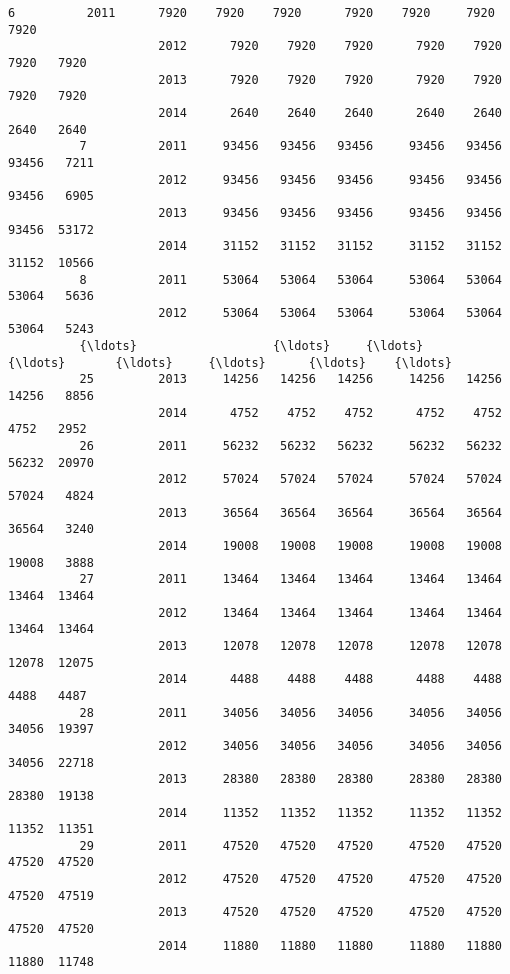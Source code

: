 \documentclass[11pt]{article}
\begin{document}
\begin{Verbatim}[commandchars=\\\{\}]
          6          2011      7920    7920    7920      7920    7920     7920   7920   
                     2012      7920    7920    7920      7920    7920     7920   7920   
                     2013      7920    7920    7920      7920    7920     7920   7920   
                     2014      2640    2640    2640      2640    2640     2640   2640   
          7          2011     93456   93456   93456     93456   93456    93456   7211   
                     2012     93456   93456   93456     93456   93456    93456   6905   
                     2013     93456   93456   93456     93456   93456    93456  53172   
                     2014     31152   31152   31152     31152   31152    31152  10566   
          8          2011     53064   53064   53064     53064   53064    53064   5636   
                     2012     53064   53064   53064     53064   53064    53064   5243   
          {\ldots}                   {\ldots}     {\ldots}     {\ldots}       {\ldots}     {\ldots}      {\ldots}    {\ldots}   
          25         2013     14256   14256   14256     14256   14256    14256   8856   
                     2014      4752    4752    4752      4752    4752     4752   2952   
          26         2011     56232   56232   56232     56232   56232    56232  20970   
                     2012     57024   57024   57024     57024   57024    57024   4824   
                     2013     36564   36564   36564     36564   36564    36564   3240   
                     2014     19008   19008   19008     19008   19008    19008   3888   
          27         2011     13464   13464   13464     13464   13464    13464  13464   
                     2012     13464   13464   13464     13464   13464    13464  13464   
                     2013     12078   12078   12078     12078   12078    12078  12075   
                     2014      4488    4488    4488      4488    4488     4488   4487   
          28         2011     34056   34056   34056     34056   34056    34056  19397   
                     2012     34056   34056   34056     34056   34056    34056  22718   
                     2013     28380   28380   28380     28380   28380    28380  19138   
                     2014     11352   11352   11352     11352   11352    11352  11351   
          29         2011     47520   47520   47520     47520   47520    47520  47520   
                     2012     47520   47520   47520     47520   47520    47520  47519   
                     2013     47520   47520   47520     47520   47520    47520  47520   
                     2014     11880   11880   11880     11880   11880    11880  11748   

\end{Verbatim}
\end{document}
